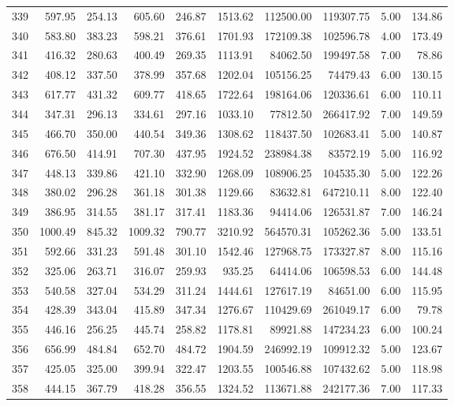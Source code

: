 \begin{tabular}{lrrrrrrrrr}
339 & 597.95 & 254.13 & 605.60 & 246.87 & 1513.62 & 112500.00 & 119307.75 & 5.00 & 134.86 \\
340 & 583.80 & 383.23 & 598.21 & 376.61 & 1701.93 & 172109.38 & 102596.78 & 4.00 & 173.49 \\
341 & 416.32 & 280.63 & 400.49 & 269.35 & 1113.91 & 84062.50 & 199497.58 & 7.00 & 78.86 \\
342 & 408.12 & 337.50 & 378.99 & 357.68 & 1202.04 & 105156.25 & 74479.43 & 6.00 & 130.15 \\
343 & 617.77 & 431.32 & 609.77 & 418.65 & 1722.64 & 198164.06 & 120336.61 & 6.00 & 110.11 \\
344 & 347.31 & 296.13 & 334.61 & 297.16 & 1033.10 & 77812.50 & 266417.92 & 7.00 & 149.59 \\
345 & 466.70 & 350.00 & 440.54 & 349.36 & 1308.62 & 118437.50 & 102683.41 & 5.00 & 140.87 \\
346 & 676.50 & 414.91 & 707.30 & 437.95 & 1924.52 & 238984.38 & 83572.19 & 5.00 & 116.92 \\
347 & 448.13 & 339.86 & 421.10 & 332.90 & 1268.09 & 108906.25 & 104535.30 & 5.00 & 122.26 \\
348 & 380.02 & 296.28 & 361.18 & 301.38 & 1129.66 & 83632.81 & 647210.11 & 8.00 & 122.40 \\
349 & 386.95 & 314.55 & 381.17 & 317.41 & 1183.36 & 94414.06 & 126531.87 & 7.00 & 146.24 \\
350 & 1000.49 & 845.32 & 1009.32 & 790.77 & 3210.92 & 564570.31 & 105262.36 & 5.00 & 133.51 \\
351 & 592.66 & 331.23 & 591.48 & 301.10 & 1542.46 & 127968.75 & 173327.87 & 8.00 & 115.16 \\
352 & 325.06 & 263.71 & 316.07 & 259.93 & 935.25 & 64414.06 & 106598.53 & 6.00 & 144.48 \\
353 & 540.58 & 327.04 & 534.29 & 311.24 & 1444.61 & 127617.19 & 84651.00 & 6.00 & 115.95 \\
354 & 428.39 & 343.04 & 415.89 & 347.34 & 1276.67 & 110429.69 & 261049.17 & 6.00 & 79.78 \\
355 & 446.16 & 256.25 & 445.74 & 258.82 & 1178.81 & 89921.88 & 147234.23 & 6.00 & 100.24 \\
356 & 656.99 & 484.84 & 652.70 & 484.72 & 1904.59 & 246992.19 & 109912.32 & 5.00 & 123.67 \\
357 & 425.05 & 325.00 & 399.94 & 322.47 & 1203.55 & 100546.88 & 107432.62 & 5.00 & 118.98 \\
358 & 444.15 & 367.79 & 418.28 & 356.55 & 1324.52 & 113671.88 & 242177.36 & 7.00 & 117.33 \\

\end{tabular}
